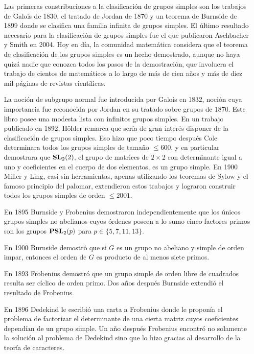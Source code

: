 


Las primeras constribuciones a la clasificación de grupos simples son los
trabajos de Galois de 1830, el tratado de Jordan de 1870 y un teorema de
Burnside de 1899 donde se clasifica una familia infinita de grupos simples. El
último resultado necesario para la clasificación de grupos simples fue
el que publicaron Aschbacher y Smith en 2004. Hoy en día, la
comunidad matemática considera que el teorema de clasificación de los grupos
simples es un hecho demostrado, aunque no haya quizá nadie que conozca todos
los pasos de la demostración, que involucra el trabajo de cientos de
matemáticos a lo largo de más de cien años y más de diez mil páginas de
revistas científicas. 


La noción de subgrupo normal fue introducida por Galois en 1832, noción cuya
importancia fue reconocida por Jordan en su tratado sobre grupos de 1870. Este
libro posee una modesta lista con infinitos grupos simples. En un trabajo
publicado en 1892, H\"older remarca que sería de gran interés disponer de la
clasificación de grupos simples. Eso hizo que poco tiempo después Cole
determinara todos los grupos simples de tamaño $\leq600$, y en particular
demostrara que $\mathbf{SL}_2(2)$, el grupo de matrices de $2\times 2$ con determinante
igual a uno y coeficientes en el cuerpo de dos elementos, es un grupo simple. En 1900 
Miller y Ling, casi sin herramientas, apenas utilizando los teoremas de Sylow y 
el famoso principio del palomar, 
extendieron estos trabajos y lograron construir todos los grupos
simples de orden $\leq2001$. 

En 1895 Burnside y Frobenius demostraron independientemente que
los únicos grupos simples no abelianos cuyos órdenes poseen a lo sumo cinco factores primos
son los grupos $\mathbf{PSL}_2(p)$ para $p\in\{5,7,11,13\}$. 

En 1900 Burnside demostró que si $G$ es un grupo no abeliano y simple de orden
impar, entonces el orden de $G$ es producto de al menos siete primos. 

En 1893 Frobenius demostró que un grupo simple de orden libre de cuadrados
resulta ser cíclico de orden primo. Dos años después Burnside extendió el
resultado de Frobenius.

En 1896 Dedekind le escribió una carta a Frobenius donde le proponía el
problema de factorizar el determinante de una cierta matriz cuyos coeficientes
dependían de un grupo simple. Un año después Frobenius encontró no solamente la
solución al problema de Dedekind sino que lo hizo gracias al desarrollo de la
teoría de caracteres. 

